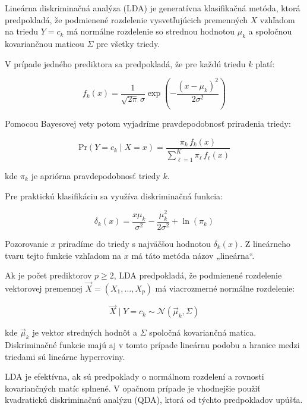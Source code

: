 Lineárna diskriminačná analýza (LDA) je generatívna klasifikačná metóda, ktorá predpokladá, že podmienené rozdelenie vysvetľujúcich premenných $X$ vzhľadom na triedu $Y = c_k$ má normálne rozdelenie so strednou hodnotou $\mu_k$ a spoločnou kovariančnou maticou $\Sigma$ pre všetky triedy.

V prípade jedného prediktora sa predpokladá, že pre každú triedu $k$ platí:

\begin{equation}
f_k(x) = \frac{1}{\sqrt{2\pi} \, \sigma} \exp\left( -\frac{(x - \mu_k)^2}{2\sigma^2} \right)
\end{equation}

Pomocou Bayesovej vety potom vyjadríme pravdepodobnosť priradenia triedy:

\begin{equation}
\mathrm{Pr}(Y = c_k \mid X = x) = \frac{\pi_k \, f_k(x)}{\sum\limits_{\ell = 1}^{K} \pi_\ell \, f_\ell(x)}
\end{equation}

kde $\pi_k$ je apriórna pravdepodobnosť triedy $k$.

Pre praktickú klasifikáciu sa využíva diskriminačná funkcia:

\begin{equation}
\delta_k(x) = \frac{x \mu_k}{\sigma^2} - \frac{\mu_k^2}{2\sigma^2} + \ln(\pi_k)
\end{equation}

Pozorovanie $x$ priradíme do triedy s najväčšou hodnotou $\delta_k(x)$. Z lineárneho tvaru tejto funkcie vzhľadom na $x$ má táto metóda názov „lineárna“.

Ak je počet prediktorov $p \geq 2$, LDA predpokladá, že podmienené rozdelenie vektorovej premennej $\vec{X} = (X_1, \dots, X_p)$ má viacrozmerné normálne rozdelenie:

\begin{equation}
\vec{X} \mid Y = c_k \sim \mathcal{N}(\vec{\mu}_k, \Sigma)
\end{equation}

kde $\vec{\mu}_k$ je vektor stredných hodnôt a $\Sigma$ spoločná kovariančná matica. Diskriminačné funkcie majú aj v tomto prípade lineárnu podobu a hranice medzi triedami sú lineárne hyperroviny.

LDA je efektívna, ak sú predpoklady o normálnom rozdelení a rovnosti kovariančných matíc splnené. V opačnom prípade je vhodnejšie použiť kvadratickú diskriminačnú analýzu (QDA), ktorá od týchto predpokladov upúšťa.

